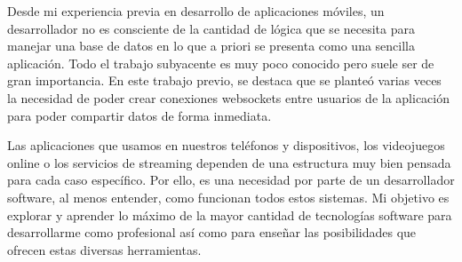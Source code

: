 Desde mi experiencia previa en desarrollo de aplicaciones móviles, un desarrollador no es consciente de la cantidad de lógica que se necesita para manejar una base
de datos en lo que a priori se presenta como una sencilla aplicación. Todo el trabajo subyacente es muy poco conocido pero suele ser de gran importancia. En este trabajo previo,
se destaca que se planteó varias veces la necesidad de poder crear conexiones websockets entre usuarios de la aplicación para poder compartir datos de forma inmediata.

Las aplicaciones que usamos en nuestros teléfonos y dispositivos, los videojuegos online o los servicios de streaming 
dependen de una estructura muy bien pensada para cada caso específico. Por ello, es una necesidad por parte de un desarrollador software, 
al menos entender, como funcionan todos estos sistemas. Mi objetivo es explorar y aprender lo máximo de la mayor cantidad de tecnologías 
software para desarrollarme como profesional así como para enseñar las posibilidades que ofrecen estas diversas herramientas.
